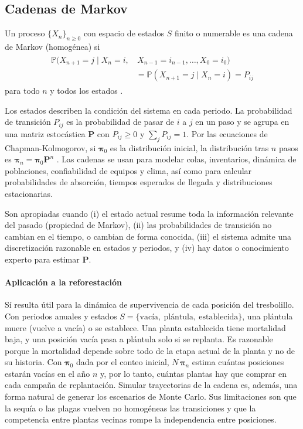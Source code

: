 \subsection{Cadenas de Markov}

\begin{definition}
    Un proceso $\{X_n\}_{n\geq0}$ con espacio de estados $S$ finito o numerable es una cadena de Markov (homogénea) si
    \begin{align}
        \begin{split}
            \mathbb{P}(X_{n+1}=j\mid X_n=i,&\,X_{n-1}=i_{n-1},\dots,X_0=i_0)\\
            &=\mathbb{P}(X_{n+1}=j\mid X_n=i)=P_{ij}
        \end{split}
    \end{align}
    para todo $n$ y todos los estados \autocite{:ross2014}.
\end{definition}

Los estados describen la condición del sistema en cada periodo. La probabilidad de transición $P_{ij}$ es la probabilidad de pasar de $i$ a $j$ en un paso y se agrupa en una matriz estocástica $\mathbf{P}$ con $P_{ij}\geq0$ y $\sum_j P_{ij}=1$. Por las ecuaciones de Chapman-Kolmogorov, si $\boldsymbol{\pi}_0$ es la distribución inicial, la distribución tras $n$ pasos es $\boldsymbol{\pi}_n=\boldsymbol{\pi}_0\mathbf{P}^n$ \autocite{:norris1997}. Las cadenas se usan para modelar colas, inventarios, dinámica de poblaciones, confiabilidad de equipos y clima, así como para calcular probabilidades de absorción, tiempos esperados de llegada y distribuciones estacionarias.

Son apropiadas cuando (i) el estado actual resume toda la información relevante del pasado (propiedad de Markov), (ii) las probabilidades de transición no cambian en el tiempo, o cambian de forma conocida, (iii) el sistema admite una discretización razonable en estados y periodos, y (iv) hay datos o conocimiento experto para estimar $\mathbf{P}$.

\paragraph{Aplicación a la reforestación} Sí resulta útil para la dinámica de supervivencia de cada posición del tresbolillo. Con periodos anuales y estados $S=\{\text{vacía},\ \text{plántula},\ \text{establecida}\}$, una plántula muere (vuelve a vacía) o se establece. Una planta establecida tiene mortalidad baja, y una posición vacía pasa a plántula solo si se replanta. Es razonable porque la mortalidad depende sobre todo de la etapa actual de la planta y no de su historia. Con $\boldsymbol{\pi}_0$ dada por el conteo inicial, $N\,\boldsymbol{\pi}_n$ estima cuántas posiciones estarán vacías en el año $n$ y, por lo tanto, cuántas plantas hay que comprar en cada campaña de replantación. Simular trayectorias de la cadena es, además, una forma natural de generar los escenarios de Monte Carlo. Sus limitaciones son que la sequía o las plagas vuelven no homogéneas las transiciones y que la competencia entre plantas vecinas rompe la independencia entre posiciones.
